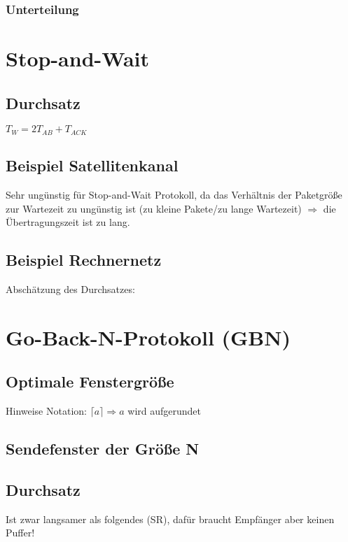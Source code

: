\subsubsection{Unterteilung}

\section{Stop-and-Wait}
\subsection{Durchsatz}
$T_W=2T_{AB}+T_{ACK}$
\subsection{Beispiel Satellitenkanal}
Sehr ungünstig für Stop-and-Wait Protokoll, da das Verhältnis der Paketgröße zur Wartezeit zu ungünstig ist (zu kleine Pakete/zu lange Wartezeit) $\Rightarrow$ die Übertragungszeit ist zu lang.
\subsection{Beispiel Rechnernetz}
Abschätzung des Durchsatzes:

\section{Go-Back-N-Protokoll (GBN)}
\subsection{Optimale Fenstergröße}
Hinweise Notation: $\lceil a \rceil \Rightarrow a$ wird aufgerundet 
\subsection{Sendefenster der Größe N}
\subsection{Durchsatz}
Ist zwar langsamer als folgendes (SR), dafür braucht Empfänger aber keinen Puffer!

